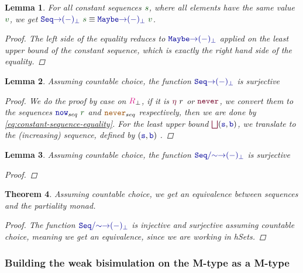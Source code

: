 \documentclass[twoside,11pt,openright]{report}
\theoremstyle{plain} %
\newtheorem{thm}{Theorem}[section]
\newtheorem{lem}[thm]{Lemma}
\theoremstyle{definition}
\theoremstyle{remark}
\newcommand*{\term}[1]{\textcolor{green!30!black}{#1}} %
\newcommand*{\type}[1]{\textcolor{magenta!90!black}{#1}}
\newcommand*{\constant}[1]{\textcolor{orange!60!black}{\ensuremath{\mathtt{#1}}}}
\newcommand*{\function}[1]{\textcolor{blue!60!black}{\ensuremath{\mathtt{#1}}}}
\newcommand*{\constructor}[1]{\textcolor{purple!60!black}{\ensuremath{\mathtt{#1}}}}
\begin{document}
\begin{lem}
  \label{eq:constant-sequence-equality}
  For all constant sequences \(\term{s}\), where all elements have the same value \(\term{v}\), we get \(\function{Seq{\rightarrow}(-)_\bot}~\term{s} \equiv \function{Maybe{\rightarrow}(-)_\bot}~\term{v}\).
  \begin{proof}
    The left side of the equality reduces to \(\function{Maybe{\rightarrow}(-)_\bot}\) applied on the least upper bound of the constant sequence, which is exactly the right hand side of the equality.
  \end{proof}
\end{lem}
\begin{lem}
  Assuming countable choice, the function \(\function{Seq{\rightarrow}(-)_\bot}\) is surjective
  \begin{proof}
    We do the proof by case  on \(\type{R}_{\bot}\), if it is \(\constructor{\eta}~r\) or \(\constructor{never}\), we convert them to the sequences \(\function{now}_{seq}~\term{r}\) and \(\constant{never}_{seq}\) respectively, then we are done by \eqref{eq:constant-sequence-equality}. For the least upper bound \(\constructor{\bigsqcup} (\function{s},\function{b})\), we translate to the (increasing) sequence, defined by \((\function{s},\function{b})\) . 
  \end{proof}
\end{lem}
\begin{lem}
  Assuming countable choice, the function \(\function{Seq/{\sim}{\rightarrow}(-)_\bot}\) is surjective
  \begin{proof}
  \end{proof}
\end{lem}
\begin{thm}
  Assuming countable choice, we get an equivalence between sequences and the partiality monad.
  \begin{proof}
 The function \(\function{Seq/{\sim}{\rightarrow}(-)_\bot}\) is injective and surjective assuming countable choice, meaning we get an equivalence, since we are working in hSets.
\end{proof}
\end{thm}

\subsubsection{Building the weak bisimulation on the M-type as a M-type}
\end{document}
